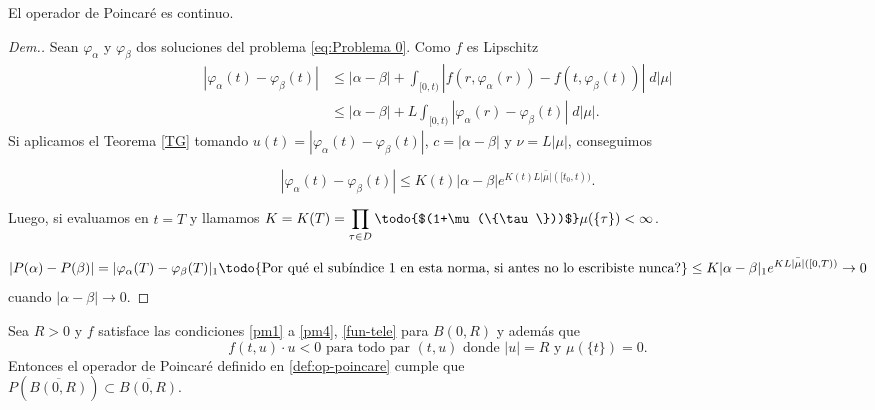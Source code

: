  
 \begin{lem}
    El operador de Poincaré es continuo.\label{opr continuo}
\end{lem}
\begin{proof}[Dem.]
 Sean $\varphi_\alpha$ y $\varphi_\beta$ dos soluciones del problema \eqref{eq:Problema 0}. Como $f$ es Lipschitz 
 \begin{equation*}
 \begin{split}
 	| \varphi_\alpha(t)-\varphi_\beta(t)|&\leq |\alpha-\beta |+\int_{[0,t)} |f(r,\varphi_\alpha(r)) -f(t,\varphi_\beta(t))| \; d|\mu|\\
	&\leq |\alpha-\beta|+L\int_{[0,t)} |\varphi_\alpha(r) -\varphi_\beta(t)| \; d|\mu|.
 \end{split}
\end{equation*}
 Si aplicamos el Teorema \ref{TG} tomando $u(t)=|\varphi_\alpha(t)-\varphi_\beta(t)|$, $c=|\alpha-\beta|$ y  $\nu=L|\mu|$, conseguimos

\begin{equation*}
|\varphi_\alpha(t)-\varphi_\beta(t)|\leq K(t) |\alpha-\beta|e^{K(t)L\bar{|\mu|}([t_0,t))}.
\end{equation*}

Luego, si evaluamos en $t=T$ y llamamos  $K=K(T)=\displaystyle\prod_{\tau\in D}\textrm{\todo{$(1+\mu(\{\tau\}))$}}\mu(\{\tau\})<\infty$.
 

\begin{equation*}
 		|P(\alpha)-P(\beta)|=|\varphi_{\alpha}(T)-\varphi_{\beta}(T)|_{1}\textrm{\todo{Por qué el subíndice 1 en esta norma, si antes no lo escribiste nunca?}}\leq K |\alpha-\beta|_{1}e^{KL\bar{|\mu|}([0,T))}\to 0
 	\end{equation*}
 cuando $|\alpha-\beta|\to 0$.
\end{proof}
 
 
 

 
 

 \begin{thm} \label{th: P}
 	Sea $R>0$ y $f$ satisface las condiciones \ref{pm1} a \ref{pm4},  \ref{fun-tele} para $B(0,R)$  y  además que
 	\begin{equation}
 		f(t,u)\cdot u<0 \text{ para todo par } (t,u) \text{ donde }  |u| =R  \text{ y   } \mu(\{t\})=0.  \label{eq:4}
 	\end{equation}
 Entonces el operador de Poincaré definido en \ref{def:op-poincare} cumple que \\
 $P\left(  \overline{B(0,R)}\right)  \subset \overline{B(0,R)}$.
 \end{thm}
 
